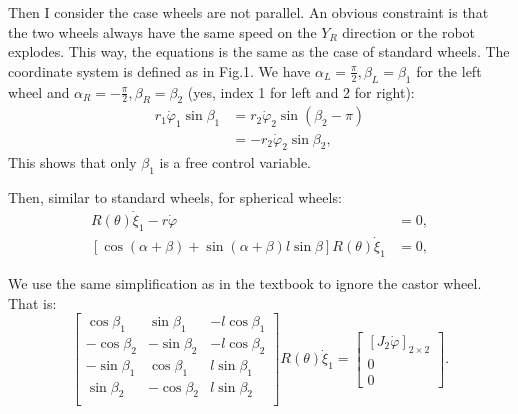 \documentclass{article}
\theoremstyle{definition}
\begin{document}
	Then I consider the case wheels are not parallel. An obvious constraint is that the two wheels always have the same speed on the $Y_R$ direction or the robot explodes. This way, the equations is the same as the case of standard wheels. The coordinate system is defined as in Fig.1. We have $\alpha_L=\frac{\pi}{2}, \beta_L=\beta_1$ for the left wheel and $\alpha_R=-\frac{\pi}{2}, \beta_R=\beta_2$ (yes, index 1 for left and 2 for right):
 	\begin{equation}
	 	\begin{aligned}
	 	r_1\dot\varphi_1\sin \beta_1 &= r_2\dot\varphi_2\sin\left(\beta_2-\pi\right) \\
	 	&= -r_2\dot\varphi_2\sin\beta_2, 
	 	\end{aligned}
 		\label{1}
	 \end{equation}
 	This shows that only $\beta_1$ is a free control variable. 
	
	Then, similar to standard wheels, for spherical wheels:
	\begin{align*}
		[\sin (\alpha+\beta)-\cos (\alpha+\beta)(-l) \cos \beta] R(\theta) \dot{\xi}_1-r \dot{\varphi} &= 0, \\
		[\cos (\alpha+\beta) + \sin (\alpha+\beta) l \sin \beta] R(\theta) \dot{\xi}_1 &= 0,
	\end{align*}

	We use the same simplification as in the textbook to ignore the castor wheel. That is:
	$$
	\left[\begin{array}{ccc}
		\cos\beta_1 & \sin\beta_1 & -l \cos\beta_1 \\
		-\cos\beta_2 & -\sin\beta_2 & -l \cos\beta_2 \\
		-\sin\beta_1 & \cos\beta_1 & l\sin\beta_1 \\
		\sin\beta_2 & -\cos\beta_2 & l\sin\beta_2 \\
	\end{array}\right] R(\theta) \dot{\xi}_1=\left[\begin{array}{c}
		\left[J_2 \dot{\varphi}\right]_{2\times 2} \\
		0 \\
		0
	\end{array}\right].
	$$
	
\end{document}
